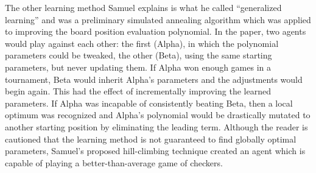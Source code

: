 The other learning method Samuel explains is what he called
``generalized learning''
and was a preliminary simulated annealing algorithm
which was applied to improving the board position evaluation polynomial.
%
In the paper,
two agents would play against each other:
the first (Alpha), in which the polynomial parameters could be tweaked,
the other (Beta), using the same starting parameters, but never updating them.
%
If Alpha won enough games in a tournament,
Beta would inherit Alpha's parameters and the adjustments would begin again.
%
This had the effect of incrementally improving the learned parameters.
%
If Alpha was incapable of consistently beating Beta,
then a local optimum was recognized and Alpha's polynomial would be drastically
mutated to another starting position
by eliminating the leading term.
%
Although the reader is cautioned that the learning method is not guaranteed to
find globally optimal parameters,
Samuel's proposed hill-climbing technique created an agent which is capable
of playing a better-than-average game of checkers.

